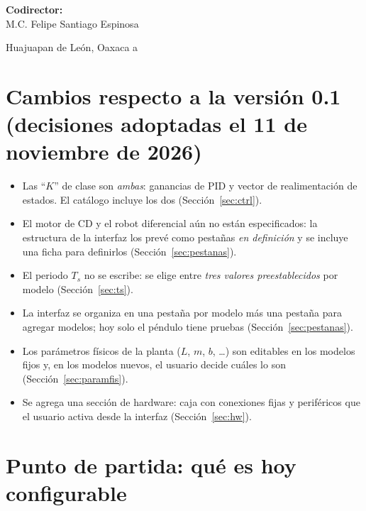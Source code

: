 \documentclass[12pt,letterpaper]{article}
\begin{document}
\begin{center}
    {\textbf{Codirector:}\\\vspace{0.2cm}
   M.C. Felipe Santiago Espinosa\vspace{0.2cm}\\}
\end{center}

\begin{center}
    \vspace{0.4cm}
	{Huajuapan de León, Oaxaca a \text{\today}}
\end{center}
\clearpage


\tableofcontents\clearpage

\section*{Cambios respecto a la versión 0.1 (decisiones adoptadas el 11 de noviembre de 2026)}
\begin{itemize}
    \item Las ``$K$'' de clase son \emph{ambas}: ganancias de PID y vector de realimentación de estados. El catálogo incluye los dos (Sección~\ref{sec:ctrl}).
    \item El motor de CD y el robot diferencial aún no están especificados: la estructura de la interfaz los prevé como pestañas \emph{en definición} y se incluye una ficha para definirlos (Sección~\ref{sec:pestanas}).
    \item El periodo $T_s$ no se escribe: se elige entre \emph{tres valores preestablecidos} por modelo (Sección~\ref{sec:ts}).
    \item La interfaz se organiza en una pestaña por modelo más una pestaña para agregar modelos; hoy solo el péndulo tiene pruebas (Sección~\ref{sec:pestanas}).
    \item Los parámetros físicos de la planta ($L$, $m$, $b$, \dots) son editables en los modelos fijos y, en los modelos nuevos, el usuario decide cuáles lo son (Sección~\ref{sec:paramfis}).
    \item Se agrega una sección de hardware: caja con conexiones fijas y periféricos que el usuario activa desde la interfaz (Sección~\ref{sec:hw}).
\end{itemize}

\section{Punto de partida: qué es hoy configurable}
\end{document}
